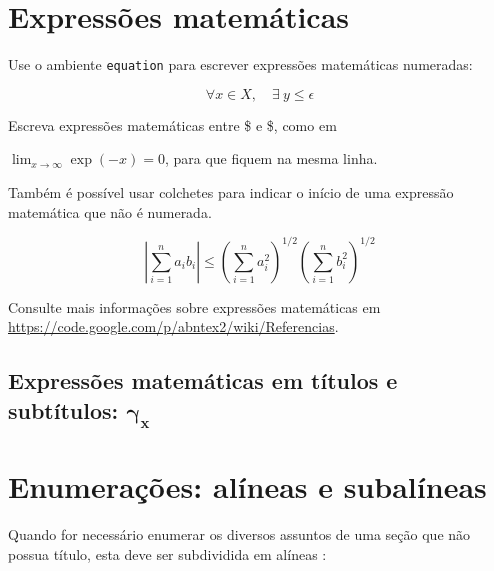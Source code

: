 \section{Expressões matemáticas}

 Use o ambiente \texttt{equation} para escrever
expressões matemáticas numeradas:

\begin{equation}
  \forall x \in X, \quad \exists \: y \leq \epsilon
\end{equation}

Escreva expressões matemáticas entre \$ e \$, como em

 $\lim_{x \to \infty}
\exp(-x) = 0 $, para que fiquem na mesma linha.

Também é possível usar colchetes para indicar o início de uma expressão
matemática que não é numerada.

\[
\left|\sum_{i=1}^n a_ib_i\right|
\le
\left(\sum_{i=1}^n a_i^2\right)^{1/2}
\left(\sum_{i=1}^n b_i^2\right)^{1/2}
\]

Consulte mais informações sobre expressões matemáticas em
\url{https://code.google.com/p/abntex2/wiki/Referencias}.


\subsection{Expressões matemáticas em títulos e subtítulos: \texorpdfstring{$\boldsymbol{\gamma_x}$}{Gammax}}






\section{Enumerações: alíneas e subalíneas}

Quando for necessário enumerar
os diversos assuntos de uma seção que não possua título, esta deve ser
subdividida em alíneas \cite[4.2]{NBR6024:2012}:

